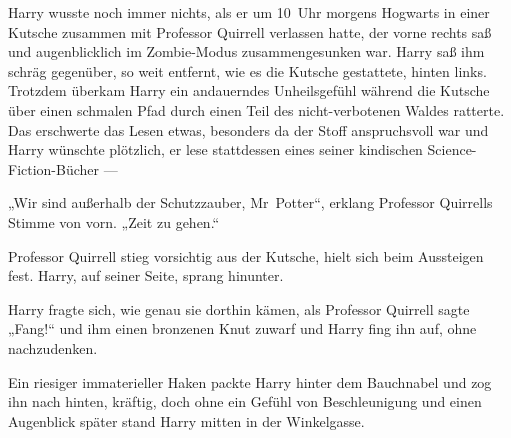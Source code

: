 Harry wusste noch immer nichts, als er um 10~Uhr morgens Hogwarts in einer Kutsche zusammen mit Professor Quirrell verlassen hatte, der vorne rechts saß und augenblicklich im Zombie-Modus zusammengesunken war. Harry saß ihm schräg gegenüber, so weit entfernt, wie es die Kutsche gestattete, hinten links. Trotzdem überkam Harry ein andauerndes Unheilsgefühl während die Kutsche über einen schmalen Pfad durch einen Teil des nicht-verbotenen Waldes ratterte. Das erschwerte das Lesen etwas, besonders da der Stoff anspruchsvoll war und Harry wünschte plötzlich, er lese stattdessen eines seiner kindischen Science-Fiction-Bücher —

„Wir sind außerhalb der Schutzzauber, Mr~Potter“, erklang Professor Quirrells Stimme von vorn.
„Zeit zu gehen.“

Professor Quirrell stieg vorsichtig aus der Kutsche, hielt sich beim Aussteigen fest. Harry, auf seiner Seite, sprang hinunter.

Harry fragte sich, wie genau sie dorthin kämen, als Professor Quirrell sagte
„Fang!“ und ihm einen bronzenen Knut zuwarf und Harry fing ihn auf, ohne nachzudenken.

Ein riesiger immaterieller Haken packte Harry hinter dem Bauchnabel und zog ihn nach hinten, kräftig, doch ohne ein Gefühl von Beschleunigung und einen Augenblick später stand Harry mitten in der Winkelgasse.

